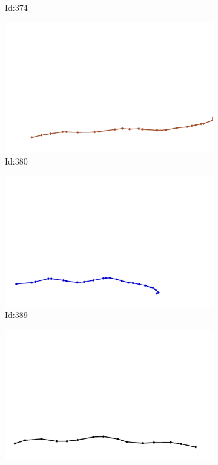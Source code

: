 \documentclass[12pt,twoside]{report}
\begin{document}
\begin{figure}
\begin{subfigure}[b]{0.20\textwidth}
\caption{Id:374}
\end{subfigure}
\begin{subfigure}[b]{0.20\textwidth}
\centering
\includegraphics[width=\textwidth]{../trajectories/380.png}
\caption{Id:380}
\end{subfigure}
\begin{subfigure}[b]{0.20\textwidth}
\centering
\includegraphics[width=\textwidth]{../trajectories/389.png}
\caption{Id:389}
\end{subfigure}
\begin{subfigure}[b]{0.20\textwidth}
\centering
\includegraphics[width=\textwidth]{../trajectories/483.png}

\end{subfigure}
\end{figure}
\end{document}
